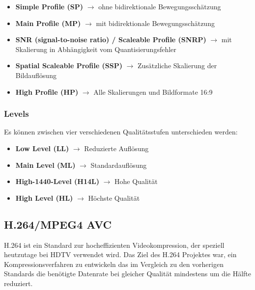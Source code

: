 \documentclass[a4paper]{article}
\begin{document}
\begin{itemize}
\item \textbf{Simple Profile (SP)} $\rightarrow$ ohne bidirektionale Bewegungsschätzung

\item \textbf{Main Profile (MP)} $\rightarrow$ mit bidirektionale Bewegungsschätzung

\item \textbf{SNR (signal-to-noise ratio) / Scaleable Profile (SNRP)} $\rightarrow$  mit Skalierung in Abhängigkeit vom Quantisierungsfehler

\item \textbf{Spatial Scaleable Profile (SSP)} $\rightarrow$ Zusätzliche Skalierung der Bildauflösung

\item \textbf{High Profile (HP)} $\rightarrow$ Alle Skalierungen und Bildformate 16:9

\end{itemize}

\subsubsection{Levels}

Es können zwischen vier verschiedenen Qualitätsstufen unterschieden werden:

\begin{itemize}
\item \textbf{Low Level (LL)} $\rightarrow$ Reduzierte Auflösung

\item \textbf{Main Level (ML)} $\rightarrow$ Standardauflösung

\item \textbf{High-1440-Level (H14L)} $\rightarrow$ Hohe Qualität

\item \textbf{High Level (HL)} $\rightarrow$ Höchste Qualität
\end{itemize}


\subsection{H.264/MPEG4 AVC}

H.264 ist ein Standard zur hocheffizienten Videokompression, der speziell heutzutage bei HDTV verwendet wird. Das Ziel des H.264 Projektes war, ein Kompressionsverfahren zu entwickeln das im Vergleich zu den vorherigen Standards die benötigte Datenrate bei gleicher Qualität mindestens um die Hälfte reduziert.
\end{document}
